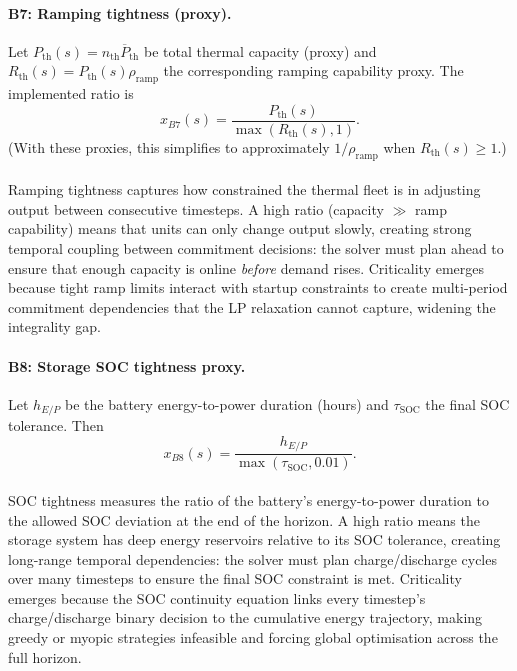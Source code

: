 \documentclass{article}
\begin{document}
\paragraph{B7: Ramping tightness (proxy).}
Let $P_{\mathrm{th}}(s)=n_{\mathrm{th}}\overline{P}_{\mathrm{th}}$ be total thermal capacity (proxy) and
$R_{\mathrm{th}}(s)=P_{\mathrm{th}}(s)\rho_{\mathrm{ramp}}$ the corresponding ramping capability proxy.
The implemented ratio is
\begin{equation}
x_{B7}(s)=\frac{P_{\mathrm{th}}(s)}{\max(R_{\mathrm{th}}(s),1)}.
\end{equation}
(With these proxies, this simplifies to approximately $1/\rho_{\mathrm{ramp}}$ when $R_{\mathrm{th}}(s)\ge 1$.)

\paragraph{}Ramping tightness captures how constrained the thermal fleet is in adjusting output between consecutive timesteps. A high ratio (capacity $\gg$ ramp capability) means that units can only change output slowly, creating strong temporal coupling between commitment decisions: the solver must plan ahead to ensure that enough capacity is online \emph{before} demand rises. Criticality emerges because tight ramp limits interact with startup constraints to create multi-period commitment dependencies that the LP relaxation cannot capture, widening the integrality gap.

\paragraph{B8: Storage SOC tightness proxy.}
Let $h_{E/P}$ be the battery energy-to-power duration (hours) and $\tau_{\mathrm{SOC}}$ the final SOC tolerance. Then
\begin{equation}
x_{B8}(s)=\frac{h_{E/P}}{\max(\tau_{\mathrm{SOC}},0.01)}.
\end{equation}

\paragraph{}SOC tightness measures the ratio of the battery's energy-to-power duration to the allowed SOC deviation at the end of the horizon. A high ratio means the storage system has deep energy reservoirs relative to its SOC tolerance, creating long-range temporal dependencies: the solver must plan charge/discharge cycles over many timesteps to ensure the final SOC constraint is met. Criticality emerges because the SOC continuity equation links every timestep's charge/discharge binary decision to the cumulative energy trajectory, making greedy or myopic strategies infeasible and forcing global optimisation across the full horizon.
\end{document}
